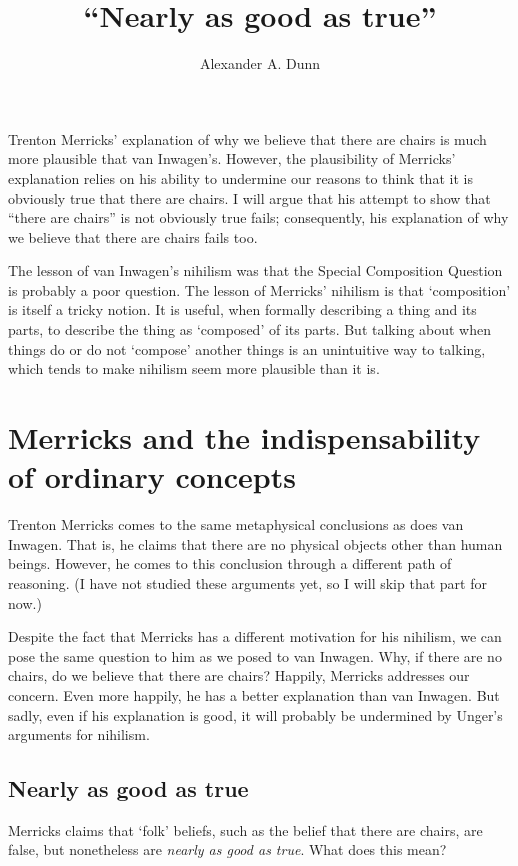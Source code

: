\documentclass[11pt]{article}
\title{``Nearly as good as true''}
\author{Alexander A. Dunn}
\begin{document}
\ifstandalone
\maketitle
\begin{spacing}{1.25}
\fi

\noindent Trenton Merricks' explanation of why we believe that there
are chairs is much more plausible that van Inwagen's.  However, the
plausibility of Merricks' explanation relies on his ability to
undermine our reasons to think that it is obviously true that there
are chairs.  I will argue that his attempt to show that ``there are
chairs'' is not obviously true fails; consequently, his explanation of
why we believe that there are chairs fails too.  

The lesson of van Inwagen's nihilism was that the Special Composition
Question is probably a poor question.  The lesson of Merricks'
nihilism is that `composition' is itself a tricky notion.  It is
useful, when formally describing a thing and its parts, to describe
the thing as `composed' of its parts.  But talking about when things
do or do not `compose' another things is an unintuitive way to
talking, which tends to make nihilism seem more plausible than it is.

\section{Merricks and the indispensability of ordinary concepts}
\label{merricks}
Trenton Merricks comes to the same metaphysical conclusions as does
van Inwagen.  That is, he claims that there are no physical objects
other than human beings.  However, he comes to this conclusion through
a different path of reasoning.  (I have not studied these arguments
yet, so I will skip that part for now.)

Despite the fact that Merricks has a different motivation for his
nihilism, we can pose the same question to him as we posed to van
Inwagen.  Why, if there are no chairs, do we believe that there are
chairs?  Happily, Merricks addresses our concern.  Even more happily,
he has a better explanation than van Inwagen.  But sadly, even if his
explanation is good, it will probably be undermined by Unger's
arguments for nihilism.

\subsection{Nearly as good as true}
\label{near}
Merricks claims that `folk' beliefs, such as the belief that there are
chairs, are false, but nonetheless are {\em nearly as good as true}.
What does this mean?


\end{spacing}
\end{document}
